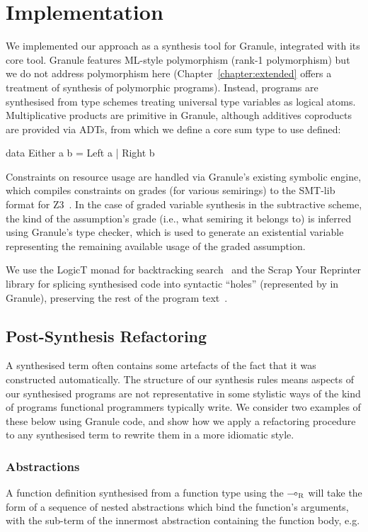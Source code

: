 \section{Implementation}
\label{sec:linear-base-implementation}
We implemented our approach as a synthesis tool for Granule, integrated with its
core tool. Granule features ML-style polymorphism (rank-1 polymorphism) but we
do not address polymorphism here (Chapter~\ref{chapter:extended} offers a treatment of 
synthesis of polymorphic programs). Instead, programs are synthesised from type
schemes treating universal type variables as logical atoms. Multiplicative
products are primitive in Granule, although additives coproducts are provided
via ADTs, from which we define a core sum type to use defined: 
\begin{granule}
  data Either a b
    = Left a 
    | Right b
\end{granule}
Constraints on resource usage are handled via Granule's existing
symbolic engine, which compiles constraints on grades (for various semirings)
to the SMT-lib format for Z3~\citep{z3}.
In the case of graded variable synthesis in the subtractive
scheme, the kind of the assumption's grade (i.e., what semiring it
belongs to) is inferred using Granule's type
checker, which is used to generate an existential variable representing
the remaining available usage of the graded assumption.

We use the LogicT monad for backtracking search~\citep{logict} and the Scrap
Your Reprinter library for splicing synthesised code into syntactic ``holes''
(represented by  in Granule), preserving the rest of the program
text~\citep{clarke2017scrap}.

\subsection{Post-Synthesis Refactoring}
\label{sec:linear-base-refactoring}
A synthesised term often contains some artefacts of the fact that it was
constructed automatically. The structure of our synthesis rules means aspects of
our synthesised programs are not representative in some stylistic ways of the
kind of programs functional programmers typically write. We consider two
examples of these below using Granule code, and show how we apply a refactoring
procedure to any synthesised term to rewrite them in a more idiomatic style. 

\subsubsection{Abstractions}
A function definition synthesised from a function type using the
$\multimap_{\textsc{R}}$ will take the form of a sequence of nested abstractions which
bind the function's arguments, with the sub-term of the innermost abstraction
containing the function body, e.g.

